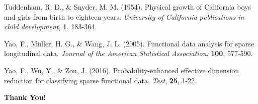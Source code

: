 \documentclass{beamer}
\begin{document}
\begin{frame}[allowframebreaks]
\begin{thebibliography}{9}
		Tuddenham, R. D., \& Snyder, M. M. (1954). Physical growth of California boys and girls from birth to eighteen years. {\em University of California publications in child development}, {\bf 1}, 183-364.
		
		Yao, F., Müller, H. G., \& Wang, J. L. (2005). Functional data analysis for sparse longitudinal data. {\em Journal of the American Statistical Association}, {\bf 100}, 577-590.
		
		Yao, F., Wu, Y., \& Zou, J. (2016). Probability-enhanced effective dimension reduction for classifying sparse functional data. {\em Test}, {\bf 25}, 1-22.
	\end{thebibliography}	
\end{frame}


\begin{frame}
	\begin{center}
		\huge
		\textbf{Thank You!}
	\end{center}
\end{frame}
\end{document}
